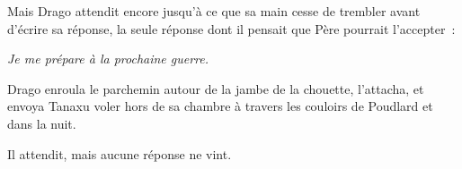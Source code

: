 Mais Drago attendit encore jusqu'à ce que sa main cesse de trembler avant d'écrire sa réponse, la seule réponse dont il pensait que Père pourrait l'accepter~:

\emph{Je me prépare à la prochaine guerre.}

Drago enroula le parchemin autour de la jambe de la chouette, l'attacha, et envoya Tanaxu voler hors de sa chambre à travers les couloirs de Poudlard et dans la nuit.

Il attendit, mais aucune réponse ne vint.

